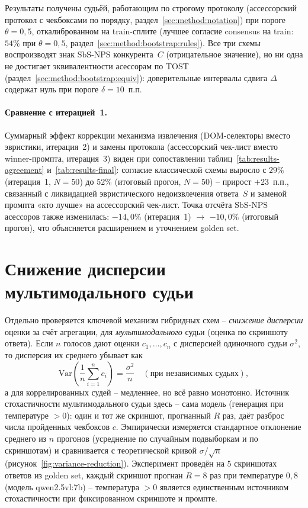 \noindent Результаты получены судьёй, работающим по строгому протоколу (ассессорский протокол с
чекбоксами по порядку, раздел~\ref{sec:method:notation}) при пороге
$\theta = 0{,}5$, откалиброванном на train-сплите
(лучшее согласие consensus на train: $54\%$ при $\theta = 0{,}5$,
раздел~\ref{sec:method:bootstrap:rules}).
Все три схемы воспроизводят знак $\mathrm{SbS\text{-}NPS}$
конкурента~$C$ (отрицательное значение), но ни одна не достигает
эквивалентности асессорам по TOST (раздел~\ref{sec:method:bootstrap:equiv}):
доверительные интервалы сдвига $\Delta$ содержат нуль при пороге
$\delta = 10$~п.п.

\paragraph{Сравнение с итерацией~1.}
Суммарный эффект коррекции механизма извлечения (DOM-селекторы вместо эвристики,
итерация~2) и замены протокола (ассессорский чек-лист вместо
winner-промпта, итерация~3) виден при сопоставлении
таблиц~\ref{tab:results-agreement} и~\ref{tab:results-final}:
согласие классической схемы выросло с $29\%$ (итерация~1, $N=50$)
до $52\%$ (итоговый прогон, $N=50$) -- прирост $+23$~п.п., связанный
с ликвидацией эвристического недоизвлечения ответа~$S$ и заменой
промпта «кто лучше» на ассессорский чек-лист.
Точка отсчёта $\mathrm{SbS\text{-}NPS}$ асессоров также изменилась:
$-14{,}0\%$ (итерация~1) $\to$ $-10{,}0\%$ (итоговый прогон), что
объясняется расширением и уточнением golden set.

\section{Снижение дисперсии мультимодального судьи}
\label{sec:results:variance}

Отдельно проверяется ключевой механизм гибридных схем -- \emph{снижение
дисперсии} оценки за счёт агрегации, для \emph{мультимодального} судьи
(оценка по скриншоту ответа).
Если $n$ голосов дают оценки $c_1, \dots, c_n$ с дисперсией одиночного
судьи $\sigma^2$, то дисперсия их среднего убывает как
\begin{equation}
    \label{eq:var-reduction}
    \mathrm{Var}\!\left(\frac{1}{n}\sum_{i=1}^{n} c_i\right)
        = \frac{\sigma^2}{n}
        \quad (\text{при независимых судьях}),
\end{equation}
а для коррелированных судей -- медленнее, но всё равно монотонно.
Источник стохастичности мультимодального судьи здесь -- сама модель
(генерация при температуре $> 0$): один и тот же скриншот, прогнанный $R$
раз, даёт разброс числа пройденных чекбоксов $c$.
Эмпирически измеряется стандартное отклонение среднего из $n$ прогонов
(усреднение по случайным подвыборкам и по скриншотам) и сравнивается с
теоретической кривой $\sigma/\sqrt{n}$
(рисунок~\ref{fig:variance-reduction}).
Эксперимент проведён на $5$ скриншотах ответов из golden set, каждый
скриншот прогнан $R = 8$ раз при температуре $0{,}8$
(модель qwen2.5vl:7b) -- температура $> 0$ является единственным
источником стохастичности при фиксированном скриншоте и промпте.

